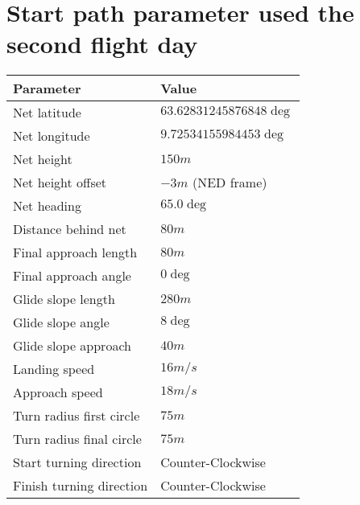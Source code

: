 \section{Start path parameter used the second flight day}
\begin{table}
\centering
\begin{tabular}{| p{4cm} | p{4cm} |}
\hline
\textbf{Parameter}			& \textbf{Value}			\\ \hline
Net latitude				& $63.62831245876848 \deg$ 	\\ \hline
Net longitude				& $9.72534155984453 \deg$ 	\\ \hline
Net height					& $150 m$					\\ \hline
Net height offset			& $-3 m$ (NED frame)		\\ \hline
Net heading					& $65.0 \deg$				\\ \hline
Distance behind net			& $80 m$					\\ \hline
Final approach length		& $80 m$					\\ \hline
Final approach angle		& $0 \deg$					\\ \hline
Glide slope length			& $280 m $					\\ \hline
Glide slope angle			& $8 \deg$					\\ \hline
Glide slope approach		& $40 m$					\\ \hline
Landing speed				& $16 m/s$					\\ \hline
Approach speed				& $18 m/s$					\\ \hline
Turn radius first circle	& $75 m$					\\ \hline
Turn radius final circle	& $75 m$					\\ \hline
Start turning direction		& Counter-Clockwise			\\ \hline
Finish turning direction	& Counter-Clockwise			\\ \hline
\end{tabular}
\end{table}
